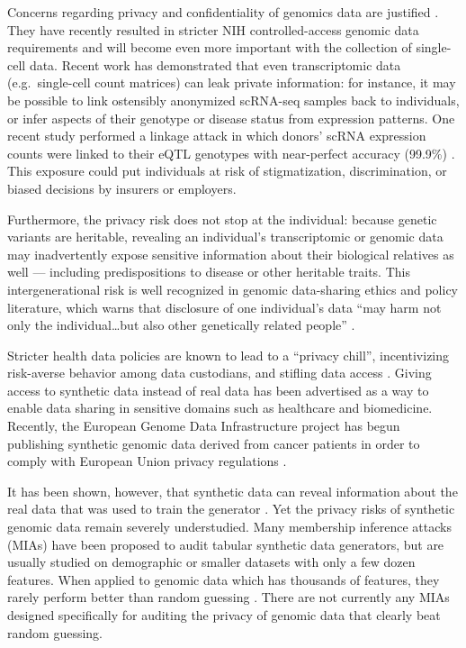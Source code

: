 \documentclass[unnumsec,webpdf,contemporary,large]{oup-authoring-template}%
\theoremstyle{thmstyleone}%
\theoremstyle{thmstyletwo}%
\theoremstyle{thmstylethree}%
\begin{document}
Concerns regarding privacy and confidentiality of genomics data are justified \cite{NIH2025,oestreich_privacy_2021}. They have recently resulted in stricter NIH controlled-access genomic data requirements \cite{noauthor_not-od-24-157_nodate} and will become even more important with the collection of single-cell data. Recent work has demonstrated that even transcriptomic data (e.g.\ single-cell count matrices) can leak private information: for instance, it may be possible to link ostensibly anonymized scRNA-seq samples back to individuals, or infer aspects of their genotype or disease status from expression patterns. One recent study performed a linkage attack in which donors' scRNA expression counts were linked to their eQTL genotypes with near-perfect accuracy (99.9\%) \cite{walker_private_2024}. This exposure could put individuals at risk of stigmatization, discrimination, or biased decisions by insurers or employers.

Furthermore, the privacy risk does not stop at the individual: because genetic variants are heritable, revealing an individual's transcriptomic or genomic data may inadvertently expose sensitive information about their biological relatives as well --- including predispositions to disease or other heritable traits. This intergenerational risk is well recognized in genomic data-sharing ethics and policy literature, which warns that disclosure of one individual's data ``may harm not only the individual\dots but also other genetically related people'' \cite{shabani_challenges_2015}.

Stricter health data policies are known to lead to a ``privacy chill'', 
incentivizing risk-averse behavior among data custodians, and stifling data access \cite{10.1093/idpl/ipae017}. Giving access to synthetic data instead of real data has been advertised as a way to enable data sharing in sensitive domains such as healthcare and biomedicine. Recently, the European Genome Data Infrastructure project has begun publishing synthetic genomic data derived from cancer patients in order to comply with European Union privacy regulations \cite{pascucci_progressing_2024}.

It has been shown, however, that synthetic data can reveal information about the real data that was used to train the generator \cite{golob_privacy_2025,zhang_membership_2022}. 
Yet the privacy risks of synthetic genomic data remain severely understudied. 
Many membership inference attacks (MIAs) have been proposed to audit tabular synthetic data generators, but are usually studied on demographic or smaller datasets \cite{houssiau2022tapas,wu2025winning} with only a few dozen features. When applied to genomic data which has thousands of features, they rarely perform better than random guessing \cite{oprisanu_utility_2022, zhang_membership_2022}. There are not currently any MIAs designed specifically for auditing the privacy of genomic data that clearly beat random guessing.
\end{document}
